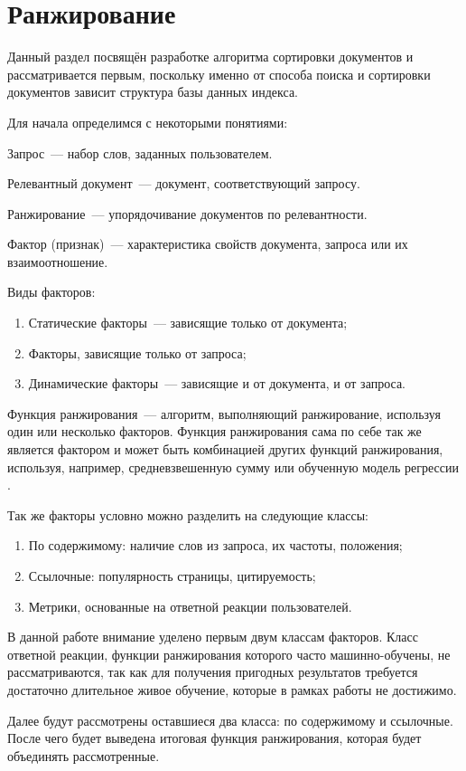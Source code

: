 \section{Ранжирование}
Данный раздел посвящён разработке алгоритма сортировки документов и рассматривается первым, поскольку именно от способа поиска и сортировки документов зависит структура базы данных индекса.

Для начала определимся с некоторыми понятиями:

Запрос~--- набор слов, заданных пользователем.

Релевантный документ~--- документ, соответствующий запросу.

Ранжирование~--- упорядочивание документов по релевантности.

Фактор (признак)~--- характеристика свойств документа, запроса или их взаимоотношение.

Виды факторов:
\begin{enumerate}
  \item Статические факторы~--- зависящие только от документа;
  \item Факторы, зависящие только от запроса;
  \item Динамические факторы~--- зависящие и от документа, и от запроса.
\end{enumerate}

Функция ранжирования~--- алгоритм, выполняющий ранжирование, используя один или несколько факторов. Функция ранжирования сама по себе так же является фактором и может быть комбинацией других функций ранжирования, используя, например, средневзвешенную сумму или обученную модель регрессии \cite{segaran07}.

Так же факторы условно можно разделить на следующие классы:
\begin{enumerate}
  \item По содержимому: наличие слов из запроса, их частоты, положения;
  \item Ссылочные: популярность страницы, цитируемость;
  \item Метрики, основанные на ответной реакции пользователей.
\end{enumerate}

В данной работе внимание уделено первым двум классам факторов. Класс ответной реакции, функции ранжирования которого часто машинно-обучены, не рассматриваются, так как для получения пригодных результатов требуется достаточно длительное живое обучение, которые в рамках работы не достижимо.

Далее будут рассмотрены оставшиеся два класса: по содержимому и ссылочные. После чего будет выведена итоговая функция ранжирования, которая будет объединять рассмотренные.


